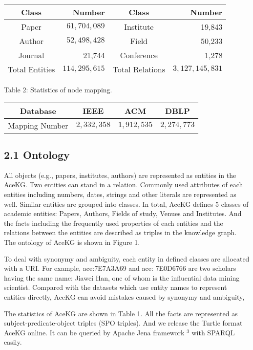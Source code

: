 \documentclass[10pt]{article}
\begin{document}
\begin{center}
\begin{tabular}{|cr|cr|}
\hline
Class & Number & Class & Number \\
\hline
Paper & $61,704,089$ & Institute & 19,843 \\
Author & $52,498,428$ & Field & 50,233 \\
Journal & 21,744 & Conference & 1,278 \\
\hline
Total Entities & $114,295,615$ & Total Relations & $3,127,145,831$ \\
\hline
\end{tabular}
\end{center}

Table 2: Statistics of node mapping.

\begin{center}
\begin{tabular}{|c|ccc|}
\hline
Database & IEEE & ACM & DBLP \\
\hline
Mapping Number & $2,332,358$ & $1,912,535$ & $2,274,773$ \\
\hline
\end{tabular}
\end{center}

\subsection*{2.1 Ontology}
All objects (e.g., papers, institutes, authors) are represented as entities in the AceKG. Two entities can stand in a relation. Commonly used attributes of each entities including numbers, dates, strings and other literals are represented as well. Similar entities are grouped into classes. In total, AceKG defines 5 classes of academic entities: Papers, Authors, Fields of study, Venues and Institutes. And the facts including the frequently used properties of each entities and the relations between the entities are described as triples in the knowledge graph. The ontology of AceKG is shown in Figure 1.

To deal with synonymy and ambiguity, each entity in defined classes are allocated with a URI. For example, ace:7E7A3A69 and ace: 7E0D6766 are two scholars having the same name: Jiawei Han, one of whom is the influential data mining scientist. Compared with the datasets which use entity names to represent entities directly, AceKG can avoid mistakes caused by synonymy and ambiguity,

The statistics of AceKG are shown in Table 1. All the facts are represented as subject-predicate-object triples (SPO triples). And we release the Turtle format AceKG online. It can be queried by Apache Jena framework ${ }^{3}$ with SPARQL easily.
\end{document}

